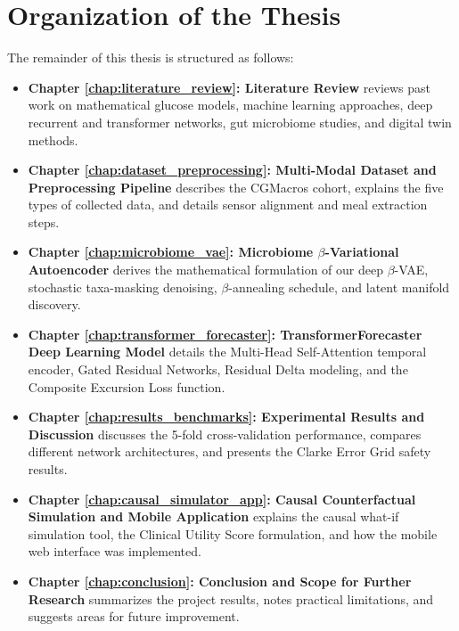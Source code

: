 \section{Organization of the Thesis}
The remainder of this thesis is structured as follows:
\begin{itemize}
    \item \textbf{Chapter \ref{chap:literature_review}: Literature Review} reviews past work on mathematical glucose models, machine learning approaches, deep recurrent and transformer networks, gut microbiome studies, and digital twin methods.
    \item \textbf{Chapter \ref{chap:dataset_preprocessing}: Multi-Modal Dataset and Preprocessing Pipeline} describes the CGMacros cohort, explains the five types of collected data, and details sensor alignment and meal extraction steps.
    \item \textbf{Chapter \ref{chap:microbiome_vae}: Microbiome $\beta$-Variational Autoencoder} derives the mathematical formulation of our deep $\beta$-VAE, stochastic taxa-masking denoising, $\beta$-annealing schedule, and latent manifold discovery.
    \item \textbf{Chapter \ref{chap:transformer_forecaster}: TransformerForecaster Deep Learning Model} details the Multi-Head Self-Attention temporal encoder, Gated Residual Networks, Residual Delta modeling, and the Composite Excursion Loss function.
    \item \textbf{Chapter \ref{chap:results_benchmarks}: Experimental Results and Discussion} discusses the 5-fold cross-validation performance, compares different network architectures, and presents the Clarke Error Grid safety results.
    \item \textbf{Chapter \ref{chap:causal_simulator_app}: Causal Counterfactual Simulation and Mobile Application} explains the causal what-if simulation tool, the Clinical Utility Score formulation, and how the mobile web interface was implemented.
    \item \textbf{Chapter \ref{chap:conclusion}: Conclusion and Scope for Further Research} summarizes the project results, notes practical limitations, and suggests areas for future improvement.
\end{itemize}
